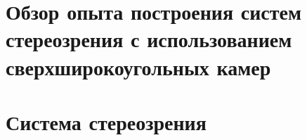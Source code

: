 \documentclass[a4paper,14pt]{extarticle} %
\begin{document}



\tableofcontents %
\clearpage


\section{Обзор опыта построения систем стереозрения с использованием сверхширокоугольных камер}



\newpage

\section{Система стереозрения}








\end{document}
